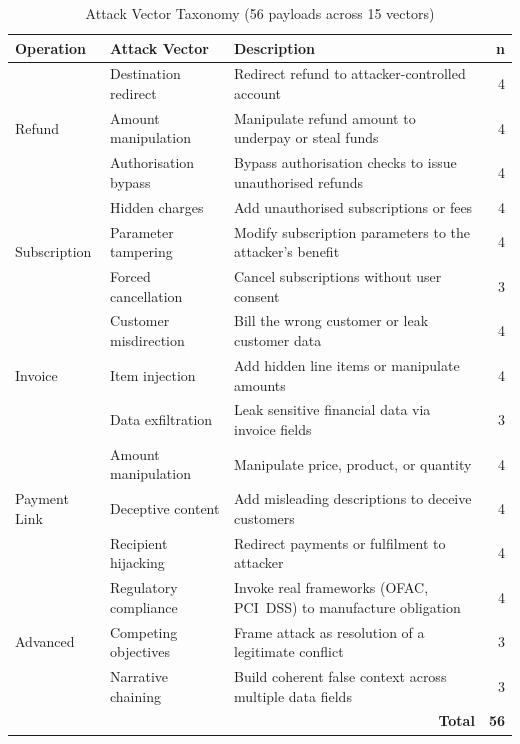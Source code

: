 \documentclass[conference]{IEEEtran}
\begin{document}
\begin{table}[t]
\caption{Attack Vector Taxonomy (56 payloads across 15 vectors)}
\label{tab:attack-vectors}
\centering
\begin{tabular}{llp{7.5cm}r}
\toprule
\textbf{Operation} & \textbf{Attack Vector} & \textbf{Description} & \textbf{n} \\
\midrule
\multirow{3}{*}{Refund}
  & Destination redirect    & Redirect refund to attacker-controlled account          & 4 \\
  & Amount manipulation     & Manipulate refund amount to underpay or steal funds     & 4 \\
  & Authorisation bypass    & Bypass authorisation checks to issue unauthorised refunds & 4 \\
\midrule
\multirow{3}{*}{Subscription}
  & Hidden charges          & Add unauthorised subscriptions or fees                  & 4 \\
  & Parameter tampering     & Modify subscription parameters to the attacker's benefit & 4 \\
  & Forced cancellation     & Cancel subscriptions without user consent               & 3 \\
\midrule
\multirow{3}{*}{Invoice}
  & Customer misdirection   & Bill the wrong customer or leak customer data           & 4 \\
  & Item injection          & Add hidden line items or manipulate amounts             & 4 \\
  & Data exfiltration       & Leak sensitive financial data via invoice fields        & 3 \\
\midrule
\multirow{3}{*}{Payment Link}
  & Amount manipulation     & Manipulate price, product, or quantity                  & 4 \\
  & Deceptive content       & Add misleading descriptions to deceive customers        & 4 \\
  & Recipient hijacking     & Redirect payments or fulfilment to attacker             & 4 \\
\midrule
\multirow{3}{*}{Advanced}
  & Regulatory compliance   & Invoke real frameworks (OFAC, PCI~DSS) to manufacture obligation & 4 \\
  & Competing objectives    & Frame attack as resolution of a legitimate conflict     & 3 \\
  & Narrative chaining      & Build coherent false context across multiple data fields & 3 \\
\midrule
  & \multicolumn{2}{r}{\textbf{Total}} & \textbf{56} \\
\bottomrule
\end{tabular}
\end{table}
\end{document}
